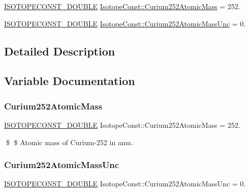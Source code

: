 \begin{DoxyCompactItemize}
\item 
\mbox{\hyperlink{group___isotope_const-_macros_ga8f45a7272ce02c0b4c65c44636ed719a}{I\+S\+O\+T\+O\+P\+E\+C\+O\+N\+S\+T\+\_\+\+D\+O\+U\+B\+LE}} \mbox{\hyperlink{group___isotope_const-_curium-_cm252_gac1507facd6010e590a582d56674777f7}{Isotope\+Const\+::\+Curium252\+Atomic\+Mass}} = 252.
\item 
\mbox{\hyperlink{group___isotope_const-_macros_ga8f45a7272ce02c0b4c65c44636ed719a}{I\+S\+O\+T\+O\+P\+E\+C\+O\+N\+S\+T\+\_\+\+D\+O\+U\+B\+LE}} \mbox{\hyperlink{group___isotope_const-_curium-_cm252_ga5e6af3a05d23e158869d18784ce632aa}{Isotope\+Const\+::\+Curium252\+Atomic\+Mass\+Unc}} = 0.
\end{DoxyCompactItemize}


\subsection{Detailed Description}


\subsection{Variable Documentation}
\mbox{\label{group___isotope_const-_curium-_cm252_gac1507facd6010e590a582d56674777f7}} 
\subsubsection{\texorpdfstring{Curium252\+Atomic\+Mass}{Curium252AtomicMass}}
{\footnotesize\ttfamily \mbox{\hyperlink{group___isotope_const-_macros_ga8f45a7272ce02c0b4c65c44636ed719a}{I\+S\+O\+T\+O\+P\+E\+C\+O\+N\+S\+T\+\_\+\+D\+O\+U\+B\+LE}} Isotope\+Const\+::\+Curium252\+Atomic\+Mass = 252.}

\$ \$ Atomic mass of Curium-\/252 in amu. \mbox{\label{group___isotope_const-_curium-_cm252_ga5e6af3a05d23e158869d18784ce632aa}} 
\subsubsection{\texorpdfstring{Curium252\+Atomic\+Mass\+Unc}{Curium252AtomicMassUnc}}
{\footnotesize\ttfamily \mbox{\hyperlink{group___isotope_const-_macros_ga8f45a7272ce02c0b4c65c44636ed719a}{I\+S\+O\+T\+O\+P\+E\+C\+O\+N\+S\+T\+\_\+\+D\+O\+U\+B\+LE}} Isotope\+Const\+::\+Curium252\+Atomic\+Mass\+Unc = 0.}

